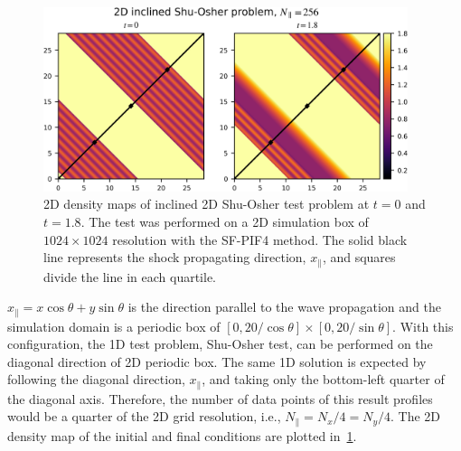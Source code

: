\begin{figure}
    \centering
    \includegraphics[width=0.95\textwidth]{fig/shu45_2d_snapshot.png}
    \caption{2D density maps of inclined 2D Shu-Osher test problem
        at \( t=0 \) and \( t=1.8 \). The test was performed on a 2D simulation box
        of \(1024 \times 1024 \) resolution with the SF-PIF4 method.
        The solid black line represents the shock propagating direction, \( x_{\parallel} \),
        and squares divide the line in each quartile.
    }\label{fig:shu45_cmap}
\end{figure}

\( x_{\parallel} = x \cos{\theta} + y \sin{\theta} \) is the direction
parallel to the wave propagation and the simulation domain is a periodic box of
\( [0, 20/\cos{\theta}] \times [0, 20/\sin{\theta}] \).
With this configuration, the 1D test problem, Shu-Osher test,
can be performed on the diagonal direction of 2D periodic box.
The same 1D solution is expected by following the diagonal direction, \( x_{\parallel} \),
and taking only the bottom-left quarter of the diagonal axis.
Therefore, the number of data points of this result profiles
would be a quarter of the 2D grid resolution,
i.e., \( N_{\parallel} = N_{x}/4 = N_{y}/4 \).
The 2D density map of the initial and final conditions are plotted in~\cref{fig:shu45_cmap}.

